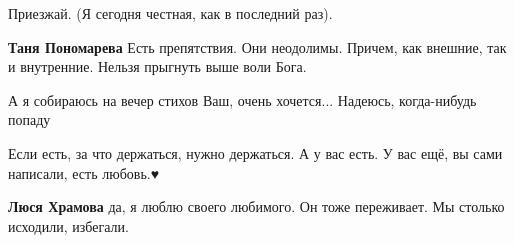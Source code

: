 \begin{itemize}
\begin{itemize}
 
Приезжай. (Я сегодня честная, как в последний раз).

 
\textbf{Таня Пономарева} Есть препятствия. Они неодолимы. Причем, как внешние, так и внутренние. Нельзя прыгнуть выше воли Бога.

 
А я собираюсь на вечер стихов Ваш, очень хочется... Надеюсь, когда-нибудь
попаду

\end{itemize}

 
Если есть, за что держаться, нужно держаться. А у вас есть. У вас ещё, вы сами
написали, есть любовь.♥️

\begin{itemize}
 
\textbf{Люся Храмова} да, я люблю своего любимого. Он тоже переживает. Мы столько исходили, избегали.
\end{itemize}

 


\end{itemize}
